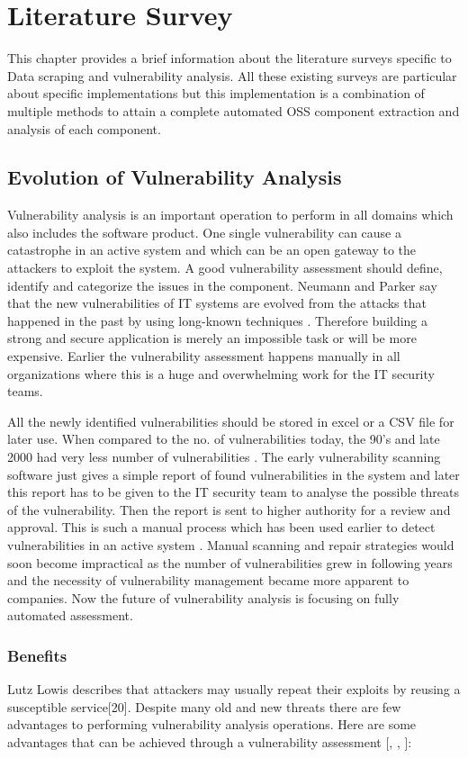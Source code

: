 %
\section{Literature Survey}\label{sec:literature survey}
%
This chapter provides a brief information about the literature surveys specific to Data scraping and vulnerability analysis. All these existing surveys are particular about specific implementations but this implementation is a combination of multiple methods to attain a complete automated OSS component extraction and analysis of each component.
%
\subsection{Evolution of Vulnerability Analysis}
Vulnerability analysis is an important operation to perform in all domains which also includes the software product. One single vulnerability can cause a catastrophe in an active system and which can be an open gateway to the attackers to exploit the system. A good vulnerability assessment should define, identify and categorize the issues in the component\cite{LinRo2021}. 
Neumann and Parker say that the new vulnerabilities of IT systems are evolved from the attacks that happened in the past by using long-known techniques \cite{NePa1989}. Therefore building a strong and secure application is merely an impossible task or will be more expensive. Earlier the vulnerability assessment happens manually in all organizations where this is a huge and overwhelming work for the IT security teams. 

All the newly identified vulnerabilities should be stored in excel or a CSV file for later use. When compared to the no. of vulnerabilities today, the 90’s and late 2000 had very less number of vulnerabilities \cite{Rh2019}. The early vulnerability scanning software just gives a simple report of found vulnerabilities in the system and later this report has to be given to the IT security team to analyse the possible threats of the vulnerability. Then the report is sent to higher authority for a review and approval. This is such a manual process which has been used earlier to detect vulnerabilities in an active system \cite{Rh2019}. Manual scanning and repair strategies would soon become impractical as the number of vulnerabilities grew in following years and the necessity of vulnerability management became more apparent to companies. Now the future of vulnerability analysis is focusing on fully automated assessment.
\subsubsection{Benefits}
Lutz Lowis describes that attackers may usually repeat their exploits by reusing a susceptible service[20]. Despite many old and new threats there are few advantages to performing vulnerability analysis operations. Here are some advantages that can be achieved through a vulnerability assessment [\cite{LoAc2011}, \cite{Rh2019}, \cite{VulTest}]:

